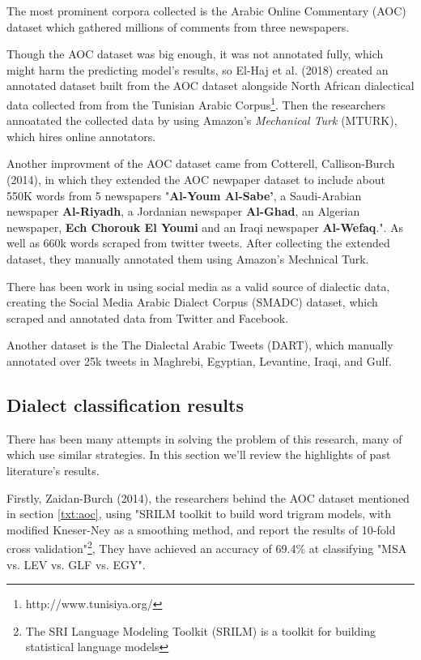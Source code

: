 \documentclass[12pt]{diazessay}
\begin{document}
    
    The most prominent corpora collected is the Arabic Online Commentary (AOC) dataset which gathered millions of comments from three newspapers\cite{zaidan_burch}\label{txt:aoc}.
    
    Though the AOC dataset was big enough, it was not annotated fully, which might harm the predicting model's results, so El-Haj et al. (2018) created an annotated dataset built from the AOC dataset alongside North African dialectical data collected from from the Tunisian Arabic Corpus\footnote{http://www.tunisiya.org/}. Then the researchers annoatated the collected data by using Amazon's \emph{Mechanical Turk} (MTURK), which hires online annotators\cite{el_haj_etal_2018_arabic}.
     
    Another improvment of the AOC dataset came from Cotterell, Callison-Burch (2014), in which they extended the AOC newpaper dataset to include about 550K words from 5 newspapers "\textbf{Al-Youm Al-Sabe’}, a Saudi-Arabian newspaper \textbf{Al-Riyadh}, a Jordanian newspaper \textbf{Al-Ghad}, an Algerian newspaper, \textbf{Ech Chorouk El Youmi} and an Iraqi newspaper \textbf{Al-Wefaq}."\cite{cotterell-callison-burch-2014-multi}. As well as 660k words scraped from twitter tweets. After collecting the extended dataset, they manually annotated them using Amazon's Mechnical Turk.
     
    There has been work in using social media as a valid source of dialectic data, creating the Social Media Arabic Dialect Corpus (SMADC) dataset, which scraped and annotated data from Twitter and Facebook\cite{alshutayri_inproceedings}.
    
    Another dataset is the The Dialectal Arabic Tweets (DART), which manually annotated over 25k tweets in Maghrebi, Egyptian, Levantine, Iraqi, and Gulf\cite{alsarsour-etal-2018-dart}.
     
     
    \subsection{Dialect classification results}
        There has been many attempts in solving the problem of this research, many of which use similar strategies. In this section we'll review the highlights of past literature's results.
        
        Firstly, Zaidan-Burch (2014), the researchers behind the AOC dataset mentioned in section \ref{txt:aoc}, using "SRILM toolkit to build word trigram models, with modified Kneser-Ney as a smoothing method, and report the results of 10-fold cross validation"\footnote{The SRI Language Modeling Toolkit (SRILM) is a toolkit for building statistical language models}\cite{zaidan_burch}, They have achieved an accuracy of 69.4\% at classifying "MSA vs. LEV vs. GLF vs. EGY"\cite{zaidan_burch}.
        
\end{document}
